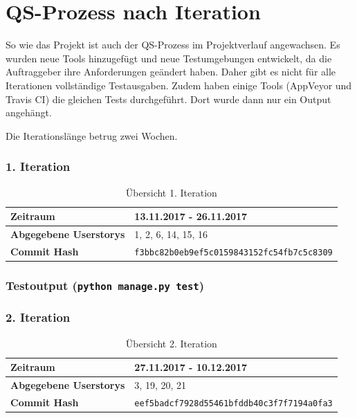 \section{QS-Prozess nach Iteration}
\lstset{style=logs}
So wie das Projekt ist auch der QS-Prozess im Projektverlauf angewachsen. Es wurden neue Tools hinzugefügt
und neue Testumgebungen entwickelt, da die Auftraggeber ihre Anforderungen geändert haben. Daher gibt
es nicht für alle Iterationen vollständige Testausgaben. Zudem haben einige Tools (AppVeyor und Travis CI)
die gleichen Tests durchgeführt. Dort wurde dann nur ein Output angehängt.

Die Iterationslänge betrug zwei Wochen.


\subsubsection{1. Iteration}
\begin{table}[H]
\begin{center}
	\begin{tabular}{| l | l |}
		\hline
		\textbf{Zeitraum} & 13.11.2017 - 26.11.2017\\\hline
		\textbf{Abgegebene Userstorys} & 1, 2, 6, 14, 15, 16 \\\hline
		\textbf{Commit Hash} & \texttt{f3bbc82b0eb9ef5c0159843152fc54fb7c5c8309} \\\hline
	\end{tabular}
	\caption{Übersicht 1. Iteration}
\end{center}
\end{table}

\subsubsection{Testoutput (\texttt{python manage.py test})}


\subsubsection{2. Iteration}
\begin{table}[H]
\begin{center}
	\begin{tabular}{| l | l |}
		\hline
		\textbf{Zeitraum} & 27.11.2017 - 10.12.2017\\\hline
		\textbf{Abgegebene Userstorys} & 3, 19, 20, 21\\\hline
		\textbf{Commit Hash} & \texttt{eef5badcf7928d55461bfddb40c3f7f7194a0fa3} \\\hline
	\end{tabular}
	\caption{Übersicht 2. Iteration}
\end{center}
\end{table}
